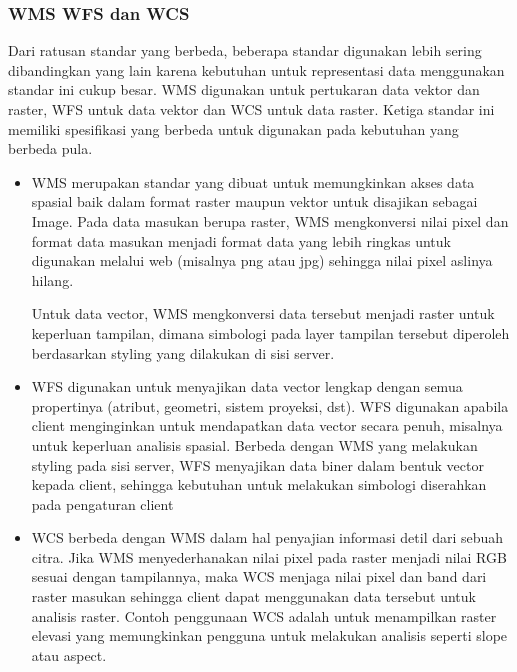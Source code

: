 \documentclass[letterpaper,10pt,english]{sphinxmanual}
\begin{document}
\subsubsection{WMS WFS dan WCS}
\label{\detokenize{sesi3/interoperabilitas:wms-wfs-dan-wcs}}
Dari ratusan standar yang berbeda, beberapa standar digunakan lebih sering dibandingkan yang lain karena kebutuhan untuk representasi data menggunakan standar ini cukup besar. WMS digunakan untuk pertukaran data vektor dan raster, WFS untuk data vektor dan WCS untuk data raster. Ketiga standar ini memiliki spesifikasi yang berbeda untuk digunakan pada kebutuhan yang berbeda pula.
\begin{itemize}
\item {} 
WMS merupakan standar yang dibuat untuk memungkinkan akses data spasial baik dalam format raster maupun vektor untuk disajikan sebagai Image. Pada data masukan berupa raster, WMS mengkonversi nilai pixel dan format data masukan menjadi format data yang lebih ringkas untuk digunakan melalui web (misalnya png atau jpg) sehingga nilai pixel aslinya hilang.


Untuk data vector, WMS mengkonversi data tersebut menjadi raster untuk keperluan tampilan, dimana simbologi pada layer tampilan tersebut diperoleh berdasarkan styling yang dilakukan di sisi server.


\item {} 
WFS digunakan untuk menyajikan data vector lengkap dengan semua propertinya (atribut, geometri, sistem proyeksi, dst). WFS digunakan apabila client menginginkan untuk mendapatkan data vector secara penuh, misalnya untuk keperluan analisis spasial. Berbeda dengan WMS yang melakukan styling pada sisi server, WFS menyajikan data biner dalam bentuk vector kepada client, sehingga kebutuhan untuk melakukan simbologi diserahkan pada pengaturan client


\item {} 
WCS berbeda dengan WMS dalam hal penyajian informasi detil dari sebuah citra. Jika WMS menyederhanakan nilai pixel pada raster menjadi nilai RGB sesuai dengan tampilannya, maka WCS menjaga nilai pixel dan band dari raster masukan sehingga client dapat menggunakan data tersebut untuk analisis raster. Contoh penggunaan WCS adalah untuk menampilkan raster elevasi yang memungkinkan pengguna untuk melakukan analisis seperti slope atau aspect.

\end{itemize}
\end{document}
